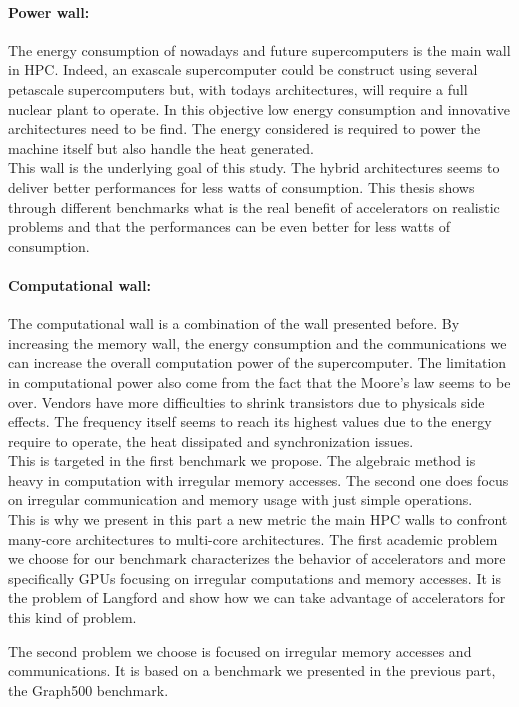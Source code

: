 \paragraph{Power wall: }
The energy consumption of nowadays and future supercomputers is the main wall in HPC. 
Indeed, an exascale supercomputer could be construct using several petascale supercomputers but, with todays architectures, will require a full nuclear plant to operate. 
In this objective low energy consumption and innovative architectures need to be find. 
The energy considered is required to power the machine itself but also handle the heat generated.\\

This wall is the underlying goal of this study. 
The hybrid architectures seems to deliver better performances for less watts of consumption.
This thesis shows through different benchmarks what is the real benefit of accelerators on realistic problems and that the performances can be even better for less watts of consumption.

\paragraph{Computational wall: }
The computational wall is a combination of the wall presented before. 
By increasing the memory wall, the energy consumption and the communications we can increase the overall computation power of the supercomputer. 
The limitation in computational power also come from the fact that the Moore's law seems to be over. 
Vendors have more difficulties to shrink transistors due to physicals side effects. 
The frequency itself seems to reach its highest values due to the energy require to operate, the heat dissipated and synchronization issues.\\ 

This is targeted in the first benchmark we propose. 
The algebraic method is heavy in computation with irregular memory accesses. 
The second one does focus on irregular communication and memory usage with just simple operations.\\

This is why we present in this part a new metric the main HPC walls to confront many-core architectures to multi-core architectures. 
The first academic problem we choose for our benchmark characterizes the behavior of accelerators and more specifically GPUs focusing on irregular computations and memory accesses. 
It is the problem of Langford and show how we can take advantage of accelerators for this kind of problem. 

The second problem we choose is focused on irregular memory accesses and communications. 
It is based on a benchmark we presented in the previous part, the Graph500 benchmark.